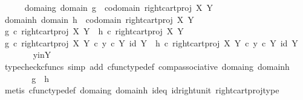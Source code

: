 \begin{isabellebody}
\ \ \ \ \isamarkupfalse%
\ domain{\isacharunderscore}{\kern0pt}g{\isacharcolon}{\kern0pt}\ {\isachardoublequoteopen}domain\ g\ {\isacharequal}{\kern0pt}\ codomain\ {\isacharparenleft}{\kern0pt}right{\isacharunderscore}{\kern0pt}cart{\isacharunderscore}{\kern0pt}proj\ X\ Y{\isacharparenright}{\kern0pt}{\isachardoublequoteclose}\isanewline
\ \ \ \ \isamarkupfalse%
\ domain{\isacharunderscore}{\kern0pt}h{\isacharcolon}{\kern0pt}\ {\isachardoublequoteopen}domain\ h\ {\isacharequal}{\kern0pt}\ codomain\ {\isacharparenleft}{\kern0pt}right{\isacharunderscore}{\kern0pt}cart{\isacharunderscore}{\kern0pt}proj\ X\ Y{\isacharparenright}{\kern0pt}{\isachardoublequoteclose}\isanewline
\ \ \ \ \isamarkupfalse%
\ {\isachardoublequoteopen}g\ {\isasymcirc}\isactrlsub c\ right{\isacharunderscore}{\kern0pt}cart{\isacharunderscore}{\kern0pt}proj\ X\ Y\ {\isacharequal}{\kern0pt}\ h\ {\isasymcirc}\isactrlsub c\ right{\isacharunderscore}{\kern0pt}cart{\isacharunderscore}{\kern0pt}proj\ X\ Y{\isachardoublequoteclose}\isanewline
\ \ \ \ \isamarkupfalse%
\ \isamarkupfalse%
\ {\isachardoublequoteopen}g\ {\isasymcirc}\isactrlsub c\ right{\isacharunderscore}{\kern0pt}cart{\isacharunderscore}{\kern0pt}proj\ X\ Y\ {\isasymcirc}\isactrlsub c\ {\isasymlangle}y\ {\isasymcirc}\isactrlsub c\ {\isasymbeta}\isactrlbsub Y\isactrlesub {\isacharcomma}{\kern0pt}\ id\ Y{\isasymrangle}\ {\isacharequal}{\kern0pt}\ h\ {\isasymcirc}\isactrlsub c\ right{\isacharunderscore}{\kern0pt}cart{\isacharunderscore}{\kern0pt}proj\ X\ Y\ {\isasymcirc}\isactrlsub c\ {\isasymlangle}y\ {\isasymcirc}\isactrlsub c\ {\isasymbeta}\isactrlbsub Y\isactrlesub {\isacharcomma}{\kern0pt}\ id\ Y{\isasymrangle}{\isachardoublequoteclose}\isanewline
\ \ \ \ \ \ \isamarkupfalse%
\ y{\isacharunderscore}{\kern0pt}in{\isacharunderscore}{\kern0pt}Y\ \isamarkupfalse%
\ {\isacharparenleft}{\kern0pt}typecheck{\isacharunderscore}{\kern0pt}cfuncs{\isacharcomma}{\kern0pt}\ simp\ add{\isacharcolon}{\kern0pt}\ cfunc{\isacharunderscore}{\kern0pt}type{\isacharunderscore}{\kern0pt}def\ comp{\isacharunderscore}{\kern0pt}associative\ domain{\isacharunderscore}{\kern0pt}g\ domain{\isacharunderscore}{\kern0pt}h{\isacharparenright}{\kern0pt}\isanewline
\ \ \ \ \isamarkupfalse%
\ \isamarkupfalse%
\ {\isachardoublequoteopen}g\ {\isacharequal}{\kern0pt}\ h{\isachardoublequoteclose}\isanewline
\ \ \ \ \ \ \isamarkupfalse%
\ {\isacharparenleft}{\kern0pt}metis\ cfunc{\isacharunderscore}{\kern0pt}type{\isacharunderscore}{\kern0pt}def\ domain{\isacharunderscore}{\kern0pt}g\ domain{\isacharunderscore}{\kern0pt}h\ id{\isacharunderscore}{\kern0pt}eq\ id{\isacharunderscore}{\kern0pt}right{\isacharunderscore}{\kern0pt}unit\ right{\isacharunderscore}{\kern0pt}cart{\isacharunderscore}{\kern0pt}proj{\isacharunderscore}{\kern0pt}type{\isacharparenright}{\kern0pt}\isanewline

\end{isabellebody}
